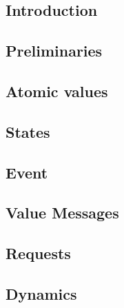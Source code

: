 \subsection{Introduction}
\label{sec:play:intro}


\subsection{Preliminaries}
\label{sec:play:prelim}



\subsection{Atomic values}
\label{sec:play:atomic}


\subsection{States}
\label{sec:play:states}


\subsection{Event}
\label{sec:play:events}


\subsection{Value Messages}
\label{sec:play:value_msgs}


\subsection{Requests}
\label{sec:play:requests}


\subsection{Dynamics}
\label{sec:play:dynamics}

